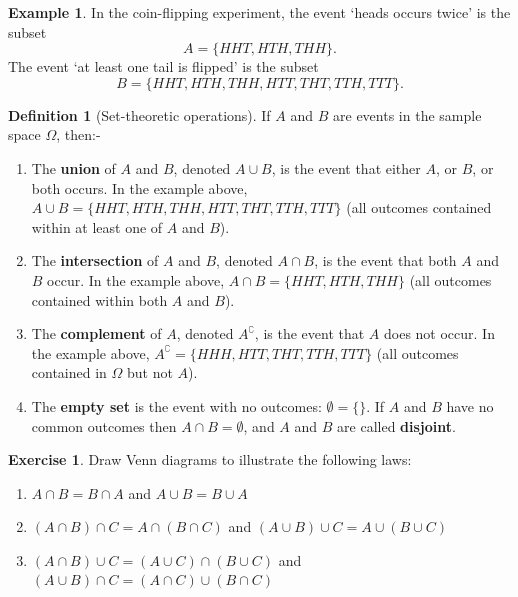 \documentclass[a4paper,leqno]{article}
\numberwithin{equation}{section}
\theoremstyle{definition}
\newtheorem{defn}[equation]{Definition}
\newtheorem{ex}[equation]{Example}
\newtheorem{exercise}[equation]{Exercise}
\theoremstyle{remark}
\newcommand{\df}{\textbf}
\newcommand{\union}{\cup}
\newcommand{\inter}{\cap}
\begin{document}
\begin{ex}
  In the coin-flipping experiment, the event `heads occurs twice' is the subset
  \begin{displaymath}
    A = \{HHT, HTH, THH\}.
  \end{displaymath}
  The event `at least one tail is flipped' is the subset
  \begin{displaymath}
    B = \{HHT, HTH, THH, HTT, THT, TTH, TTT\}.
  \end{displaymath}
\end{ex}

\begin{defn}[Set-theoretic operations]
  If $ A $ and $ B $ are events in the sample space $ \Omega $, then:-
  \begin{enumerate}
    \item The \df{union} of $ A $ and $ B $, denoted $ A \union B $, is the event that either $ A $, or $ B $, or both occurs. In the
          example above, $ A \union B = \{HHT, HTH, THH, HTT, THT, TTH, TTT\} $ (all outcomes contained within at least one of $ A $ and $ B $).
    \item The \df{intersection} of $ A $ and $ B $, denoted $ A \inter B $, is the event that both $ A $ and $ B $ occur. In the example
          above, $ A \inter B = \{HHT, HTH, THH\} $ (all outcomes contained within both $ A $ and $ B $).
    \item The \df{complement} of $ A $, denoted $ A^\complement $, is the event that $ A $ does not occur. In the example above,
          $ A^\complement = \{HHH, HTT, THT, TTH, TTT\} $ (all outcomes contained in $ \Omega $ but not $ A $).
    \item The \df{empty set} is the event with no outcomes: $ \emptyset = \{\} $. If $ A $ and $ B $ have no common outcomes
          then $ A \inter B = \emptyset $, and $ A $ and $ B $ are called \df{disjoint}.
  \end{enumerate}
\end{defn}

\begin{exercise}
  Draw Venn diagrams to illustrate the following laws:
  \begin{enumerate}
    \item $ A \inter B = B \inter A $ and $ A \union B = B \union A $
    \item $ (A \inter B) \inter C = A \inter (B \inter C) $ and $ (A \union B) \union C = A \union (B \union C) $
    \item $ (A \inter B) \union C = (A \union C) \inter (B \union C) $ and $ (A \union B) \inter C = (A \inter C) \union (B \inter C) $
  \end{enumerate}
\end{exercise}
\end{document}
